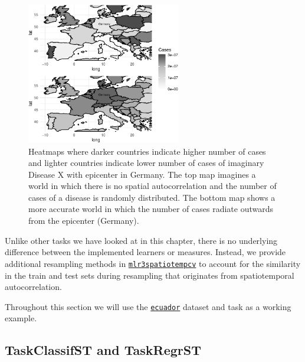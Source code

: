 \begin{figure}

{\centering \includegraphics[width=0.6\textwidth,height=0.6\textheight]{chapters/chapter13/beyond_regression_and_classification_files/figure-pdf/fig-autocorrelation-1.pdf}

}

\caption{\label{fig-autocorrelation}Heatmaps where darker countries
indicate higher number of cases and lighter countries indicate lower
number of cases of imaginary Disease X with epicenter in Germany. The
top map imagines a world in which there is no spatial autocorrelation
and the number of cases of a disease is randomly distributed. The bottom
map shows a more accurate world in which the number of cases radiate
outwards from the epicenter (Germany).}

\end{figure}

Unlike other tasks we have looked at in this chapter, there is no
underlying difference between the implemented learners or measures.
Instead, we provide additional resampling methods in
\href{https://mlr3spatiotempcv.mlr-org.com}{\texttt{mlr3spatiotempcv}}
to account for the similarity in the train and test sets during
resampling that originates from spatiotemporal autocorrelation.

Throughout this section we will use the
\href{https://mlr3spatiotempcv.mlr-org.com/reference/ecuador.html}{\texttt{ecuador}}
dataset and task as a working example.

\hypertarget{taskclassifst-and-taskregrst}{%
\subsection{TaskClassifST and
TaskRegrST}\label{taskclassifst-and-taskregrst}}

